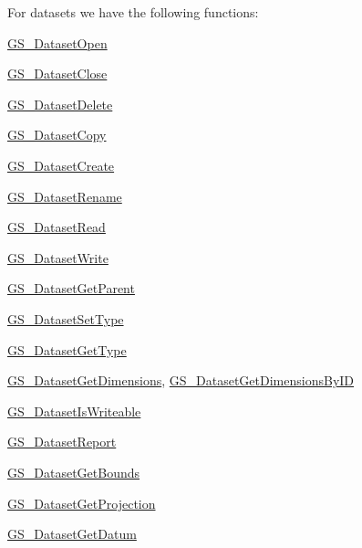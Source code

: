 For datasets we have the following functions\+: \begin{DoxyItemize}
\item \hyperlink{hdf5mine_8h_aee86e45ef56ab3672a06a8358ceddd22}{G\+S\+\_\+\+Dataset\+Open} \item \hyperlink{hdf5mine_8h_a0e45ff4ddce2aa6a3b9bfc2fed6db732}{G\+S\+\_\+\+Dataset\+Close} \item \hyperlink{hdf5mine_8h_ab0d51bd0ba6059ee886dfaba336c5204}{G\+S\+\_\+\+Dataset\+Delete} \item \hyperlink{hdf5mine_8h_a33ad89473421fe4412c94b63925e7230}{G\+S\+\_\+\+Dataset\+Copy} \item \hyperlink{hdf5mine_8h_ae0ffd3948a97404443965314444851a0}{G\+S\+\_\+\+Dataset\+Create} \item \hyperlink{hdf5mine_8h_a2af2abcb067c072ce872a7960de5408f}{G\+S\+\_\+\+Dataset\+Rename} \item \hyperlink{hdf5mine_8h_a78ec4d9837e5c2fb18d2f5df73e35976}{G\+S\+\_\+\+Dataset\+Read} \item \hyperlink{hdf5mine_8h_ae4294019ff956c155bb3840107b0b2ea}{G\+S\+\_\+\+Dataset\+Write} \item \hyperlink{hdf5mine_8h_a27e5fad454754ce0aa3b84c460bdc9cc}{G\+S\+\_\+\+Dataset\+Get\+Parent} \item \hyperlink{hdf5mine_8h_a0a4deab12ab7dfe07397b53270082fa6}{G\+S\+\_\+\+Dataset\+Set\+Type} \item \hyperlink{hdf5mine_8h_a91429cf8a83c64b406f9312aaf561e4c}{G\+S\+\_\+\+Dataset\+Get\+Type} \item \hyperlink{hdf5mine_8h_a33c1f079f9c8912cdb50b255d9ce0d66}{G\+S\+\_\+\+Dataset\+Get\+Dimensions}, \hyperlink{hdf5mine_8h_a3be8ab589e38cd720f6d4bb2278b749e}{G\+S\+\_\+\+Dataset\+Get\+Dimensions\+By\+I\+D} \item \hyperlink{hdf5mine_8h_a1c6c74cd8887d139006bdc54f4bec325}{G\+S\+\_\+\+Dataset\+Is\+Writeable} \item \hyperlink{hdf5mine_8h_a05bd3bd840dacdb60e9d456c8dec054e}{G\+S\+\_\+\+Dataset\+Report} \item \hyperlink{hdf5mine_8h_afcf0f688a88b1695063a5ab77274ed3b}{G\+S\+\_\+\+Dataset\+Get\+Bounds} \item \hyperlink{hdf5mine_8h_a6da4fa0d563fa782250970c9c6a31995}{G\+S\+\_\+\+Dataset\+Get\+Projection} \item \hyperlink{hdf5mine_8h_ab716d2f8b84a1db410259b81aaae6e1b}{G\+S\+\_\+\+Dataset\+Get\+Datum}\end{DoxyItemize}
